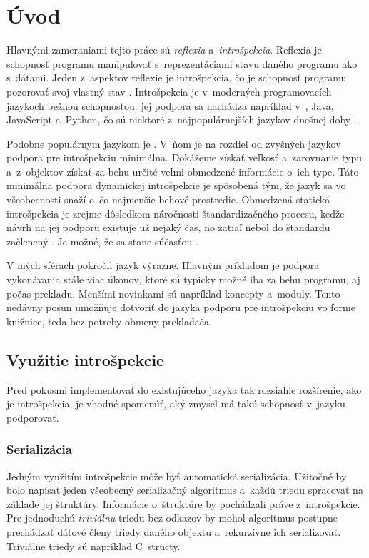 \chapter{Úvod}

Hlavnými zameraniami tejto práce sú \emph{reflexia} a~\emph{introšpekcia}. Reflexia je schopnosť programu manipulovať s~reprezentáciami stavu daného programu ako s~dátami. Jeden z~aspektov reflexie je introšpekcia, čo je schopnosť programu pozorovať svoj vlastný stav \citep{demers1995reflection}. Introšpekcia je v~moderných programovacích jazykoch bežnou schopnosťou: jej podpora sa nachádza napríklad v~\Csharp{}, Java, JavaScript a~Python, čo sú niektoré z~najpopulárnejších jazykov dnešnej doby \citep{jetbrains}.

Podobne populárnym jazykom je \Cpp{}. V~ňom je na rozdiel od zvyšných jazykov podpora pre introšpekciu minimálna. Dokážeme získať veľkosť a~zarovnanie typu a~z~objektov získať za behu určité veľmi obmedzené informácie o~ich type. Táto minimálna podpora dynamickej introšpekcie je spôsobená tým, že jazyk \Cpp{} sa vo všeobecnosti snaží o~čo najmenšie behové prostredie. Obmedzená statická introšpekcia je zrejme dôsledkom náročnosti štandardizačného procesu, keďže návrh na jej podporu existuje už nejaký čas, no zatiaľ nebol do štandardu začlenený \citep{loikkanen}. Je možné, že sa stane súčasťou .

V iných sférach pokročil jazyk \Cpp{} výrazne. Hlavným príkladom je podpora vykonávania stále viac úkonov, ktoré sú typicky možné iba za behu programu, aj počas prekladu. Menšími novinkami sú napríklad koncepty a~moduly. Tento nedávny posun umožňuje dotvoriť do jazyka podporu pre introšpekciu vo forme knižnice, teda bez potreby obmeny prekladača.

\section{Využitie introšpekcie}

Pred pokusmi implementovať do existujúceho jazyka tak rozsiahle rozšírenie, ako je introšpekcia, je vhodné spomenúť, aký zmysel má takú schopnosť v~jazyku podporovať.

\subsection{Serializácia}

Jedným využitím introšpekcie môže byť automatická serializácia. Užitočné by bolo napísať jeden všeobecný serializačný algoritmus a~každú triedu spracovať na základe jej štruktúry. Informácie o~štruktúre by pochádzali práve z~introšpekcie. Pre jednoduchú \emph{triviálnu} triedu bez odkazov by mohol algoritmus postupne prechádzať dátové členy triedy daného objektu a~rekurzívne ich serializovať. Triviálne triedy sú napríklad C~structy.


